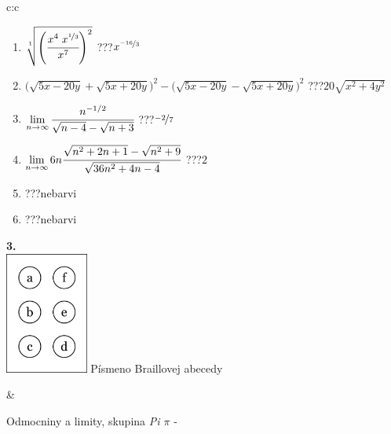 \documentclass[10pt]{report}
\begin{document}
\begin{tabular}{c:c}
\begin{minipage}[c][104.5mm][t]{0.5\linewidth}
\begin{center}
\begin{minipage}{0.79\linewidth}
\begin{center}
\begin{varwidth}{\linewidth}
\begin{enumerate}
\small
\item $\sqrt[1]{\left(\cfrac{x^{4}\;x^{\nicefrac{1}{3}}}{x^{7}}\right)^{2}}$\quad \dotfill\; ???\;\dotfill \quad $x^{\nicefrac{-16}{3}}$
\item {\footnotesize{\scriptsize$\big(\sqrt{5x-20y}+\sqrt{5x+20y}\big)^2-\big(\sqrt{5x-20y}-\sqrt{5x+20y}\big)^2$}\quad \dotfill\; ???\;\dotfill \quad $20\sqrt{x^2+4y^2}$}
\item $\lim\limits_{n\to\infty}\cfrac{n^{-1/2}}{\sqrt{n-4}-\sqrt{n+3}}$\quad \dotfill\; ???\;\dotfill \quad $\nicefrac{-2}{7}$
\item $\lim\limits_{n\to\infty}6n\cfrac{\sqrt{n^2+2n+1}-\sqrt{n^2+9}}{\sqrt{36n^2+4n-4}}$\quad \dotfill\; ???\;\dotfill \quad $2$
\item \quad \dotfill\; ???\;\dotfill \quad nebarvi
\item \quad \dotfill\; ???\;\dotfill \quad nebarvi
\end{enumerate}
\end{varwidth}
\end{center}
\end{minipage}
\begin{minipage}{0.20\linewidth}
\begin{center}
{\Huge\bfseries 3.} \\[2mm]
\includegraphics[height=40mm]{../images/braille.png}
{\small Písmeno Braillovej abecedy}
\end{center}
\end{minipage}
\end{center}
\end{minipage}
&
\begin{minipage}[c][104.5mm][t]{0.5\linewidth}
\begin{center}
\vspace{7mm}
{\huge Odmocniny a limity, skupina \textit{Pi $\pi$} -}\\[5mm]

\end{center}
\end{minipage}
\end{tabular}
\end{document}
